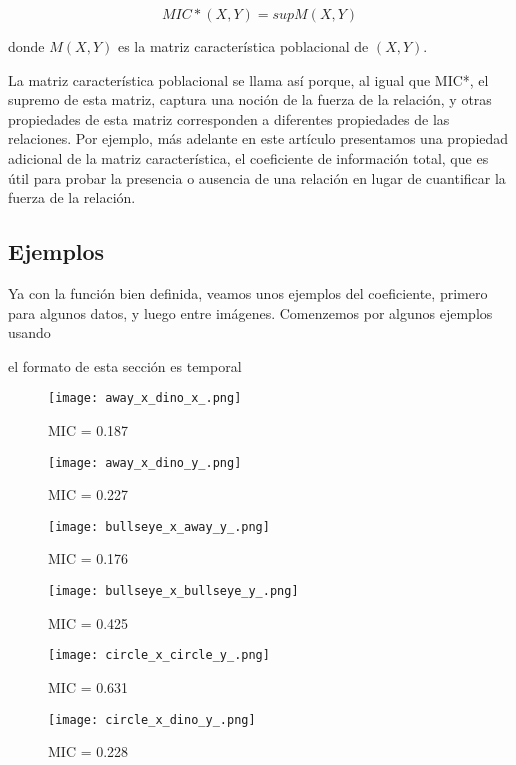 	$$MIC*(X,Y) = sup M(X,Y)$$
	
	donde $M(X,Y)$ es la matriz caracter\'istica poblacional de $(X,Y)$.
	
	La matriz caracter\'istica poblacional se llama as\'i porque, al igual que MIC*, el supremo de esta matriz, captura una noci\'on de la fuerza de la relaci\'on, y otras propiedades de esta matriz corresponden a diferentes propiedades de las relaciones. Por ejemplo, m\'as adelante en este art\'iculo presentamos una propiedad adicional de la matriz caracter\'istica, el coeficiente de informaci\'on total, que es \'util para probar la presencia o ausencia de una relaci\'on en lugar de cuantificar la fuerza de la relaci\'on.

	\subsection[]{Ejemplos}

	Ya con la funci\'on bien definida, veamos unos ejemplos del coeficiente, primero para algunos datos, y luego entre im\'agenes. Comenzemos por algunos ejemplos usando 

	el formato de esta secci\'on es temporal

	\begin{figure}[H]
		\centering
		\texttt{[image: away\_x\_dino\_x\_.png]}
		\caption{ MIC = 0.187}
		\end{figure}
		
		\begin{figure}[H]
		\centering
		\texttt{[image: away\_x\_dino\_y\_.png]}
		\caption{ MIC = 0.227}
		\end{figure}
		
		\begin{figure}[H]
		\centering
		\texttt{[image: bullseye\_x\_away\_y\_.png]}
		\caption{ MIC = 0.176}
		\end{figure}
		
		\begin{figure}[H]
		\centering
		\texttt{[image: bullseye\_x\_bullseye\_y\_.png]}
		\caption{ MIC = 0.425}
		\end{figure}
		
		\begin{figure}[H]
		\centering
		\texttt{[image: circle\_x\_circle\_y\_.png]}
		\caption{ MIC = 0.631}
		\end{figure}
		
		\begin{figure}[H]
		\centering
		\texttt{[image: circle\_x\_dino\_y\_.png]}
		\caption{ MIC = 0.228}
		\end{figure}
		
